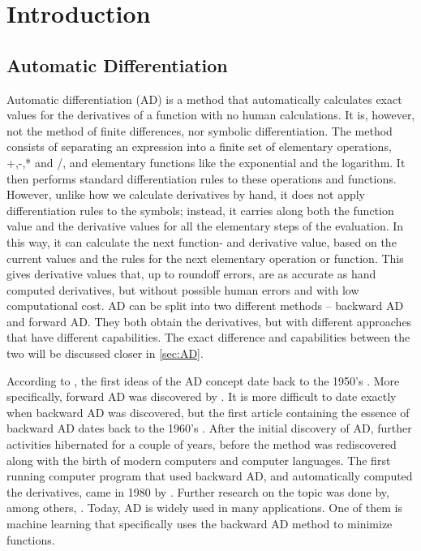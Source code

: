 \chapter{Introduction}
\section{Automatic Differentiation}
Automatic differentiation (AD) is a method that automatically calculates exact values for the derivatives of a function with no human calculations. It is, however, not the method of finite differences, nor symbolic differentiation. The method consists of separating an expression into a finite set of elementary operations, +,-,* and /, and elementary functions like the exponential and the logarithm. It then performs standard differentiation rules to these operations and functions. However, unlike how we calculate derivatives by hand, it does not apply differentiation rules to the symbols; instead, it carries along both the function value and the derivative values for all the elementary steps of the evaluation. In this way, it can calculate the next function- and derivative value, based on the current values and the rules for the next elementary operation or function. This gives derivative values that, up to roundoff errors, are as accurate as hand computed derivatives, but without possible human errors and with low computational cost. AD can be split into two different methods -- backward AD and forward AD. They both obtain the derivatives, but with different approaches that have different capabilities. The exact difference and capabilities between the two will be discussed closer in \autoref{sec:AD}. 

According to \emph{\cite{SurveyAD}}, the first ideas of the AD concept date back to the 1950's \emph{\citep{nolan1953analytical, beda1959programs}}. More specifically, forward AD was discovered by \emph{\citet{wengert1964simple}}. It is more difficult to date exactly when backward AD was discovered, but the first article containing the essence of backward AD dates back to the 1960's \emph{\citep{boltyanskii1960theory}}. After the initial discovery of AD, further activities hibernated for a couple of years, before the method was rediscovered along with the birth of modern computers and computer languages. The first running computer program that used backward AD, and automatically computed the derivatives, came in 1980 by \emph{\citet{speelpenning1980compiling}}. Further research on the topic was done by, among others, \emph{\citet{griewank1989automatic}}. Today, AD is widely used in many applications. One of them is machine learning that specifically uses the backward AD method to minimize functions. 

